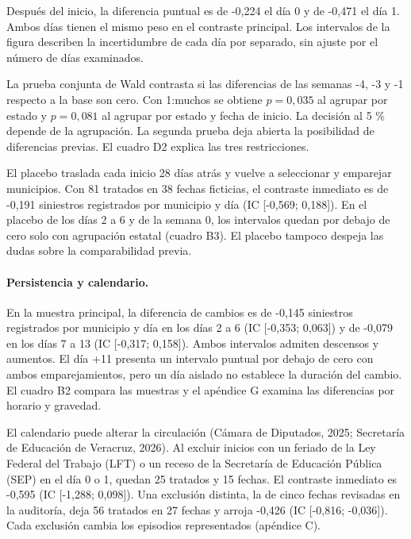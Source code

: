 \documentclass[11pt,letterpaper]{article}
\begin{document}
Después del inicio, la diferencia puntual es de -0,224 el día 0 y de -0,471 el día 1. Ambos días tienen el mismo peso en el contraste principal. Los intervalos de la figura describen la incertidumbre de cada día por separado, sin ajuste por el número de días examinados.\par

La prueba conjunta de Wald contrasta si las diferencias de las semanas -4, -3 y -1 respecto a la base son cero. Con 1:muchos se obtiene $p=0{,}035$ al agrupar por estado y $p=0{,}081$ al agrupar por estado y fecha de inicio. La decisión al 5 \% depende de la agrupación. La segunda prueba deja abierta la posibilidad de diferencias previas. El cuadro D2 explica las tres restricciones.\par

El placebo traslada cada inicio 28 días atrás y vuelve a seleccionar y emparejar municipios. Con 81 tratados en 38 fechas ficticias, el contraste inmediato es de -0,191 siniestros registrados por municipio y día (IC [-0,569; 0,188]). En el placebo de los días 2 a 6 y de la semana 0, los intervalos quedan por debajo de cero solo con agrupación estatal (cuadro B3). El placebo tampoco despeja las dudas sobre la comparabilidad previa.\par

\clearpage

\paragraph{Persistencia y calendario.}

En la muestra principal, la diferencia de cambios es de -0,145 siniestros registrados por municipio y día en los días 2 a 6 (IC [-0,353; 0,063]) y de -0,079 en los días 7 a 13 (IC [-0,317; 0,158]). Ambos intervalos admiten descensos y aumentos. El día +11 presenta un intervalo puntual por debajo de cero con ambos emparejamientos, pero un día aislado no establece la duración del cambio. El cuadro B2 compara las muestras y el apéndice G examina las diferencias por horario y gravedad.\par

El calendario puede alterar la circulación (Cámara de Diputados, 2025; Secretaría de Educación de Veracruz, 2026). Al excluir inicios con un feriado de la Ley Federal del Trabajo (LFT) o un receso de la Secretaría de Educación Pública (SEP) en el día 0 o 1, quedan 25 tratados y 15 fechas. El contraste inmediato es -0,595 (IC [-1,288; 0,098]). Una exclusión distinta, la de cinco fechas revisadas en la auditoría, deja 56 tratados en 27 fechas y arroja -0,426 (IC [-0,816; -0,036]). Cada exclusión cambia los episodios representados (apéndice C).\par
\end{document}
